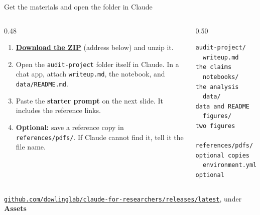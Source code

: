 \begin{frame}[fragile]{Get the materials and open the folder in Claude}
  \vfill
  \begin{columns}[c]
    \begin{column}{0.48\textwidth}
      \begin{enumerate}\small\setlength\itemsep{0.6em}
        \item \href{https://github.com/dowlinglab/claude-for-researchers/releases/latest}{\textbf{Download the ZIP}} (address below) and unzip it.
        \item Open the \texttt{audit-project} folder itself in Claude. In a chat app, attach \texttt{writeup.md}, the notebook, and \texttt{data/README.md}.
        \item Paste the \textbf{starter prompt} on the next slide. It includes the reference links.
        \item \textbf{Optional:} save a reference copy in \texttt{references/pdfs/}. If Claude cannot find it, tell it the file name.
      \end{enumerate}
    \end{column}
    \begin{column}{0.50\textwidth}
      \begin{lstlisting}[basicstyle=\ttfamily\scriptsize]
audit-project/
  writeup.md         the claims
  notebooks/         the analysis
  data/              data and README
  figures/           two figures
  references/pdfs/   optional copies
  environment.yml    optional
      \end{lstlisting}
    \end{column}
  \end{columns}
  \vspace{0.4em}
  \begin{center}
    {\small\href{https://github.com/dowlinglab/claude-for-researchers/releases/latest}{\texttt{github.com/dowlinglab/claude-for-researchers/releases/latest}}, under \textbf{Assets}}
  \end{center}
  \vspace{1.6cm plus 1fill}
\end{frame}

